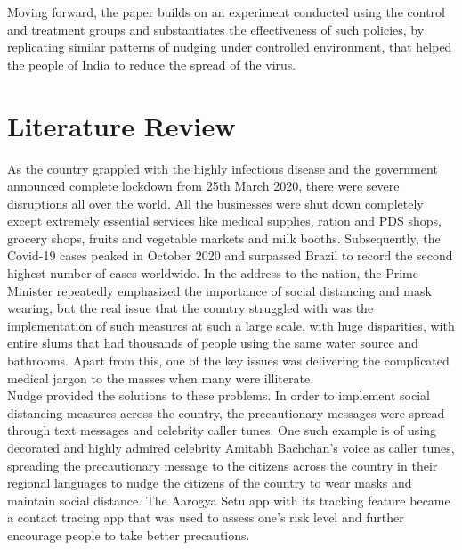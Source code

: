 \documentclass[12pt, a4paper]{article}
\begin{document}
Moving forward, the paper builds on an experiment conducted using the control and treatment groups and substantiates the effectiveness of such policies, by replicating similar patterns of nudging under controlled environment, that helped the people of India to reduce the spread of the virus. \\


\section{\centering Literature Review}
As the country grappled with the highly infectious disease and the government announced complete lockdown from 25th March 2020, there were severe disruptions all over the world. All the businesses were shut down completely except extremely essential services like medical supplies, ration and PDS shops, grocery shops, fruits and vegetable markets and milk booths. Subsequently, the Covid-19 cases peaked in October 2020 and surpassed Brazil to record the second highest number of cases worldwide. In the address to the nation, the Prime Minister repeatedly emphasized the importance of social distancing and mask wearing, but the real issue that the country struggled with was the implementation of such measures at such a large scale, with huge disparities, with entire slums that had thousands of people using the same water source and bathrooms. Apart from this, one of the key issues was delivering the complicated medical jargon to the masses when many were illiterate.\\
Nudge provided the solutions to these problems. In order to implement social distancing measures across the country, the precautionary messages were spread through text messages and celebrity caller tunes. One such example is of using decorated and highly admired celebrity Amitabh Bachchan’s voice as caller tunes, spreading the precautionary message to the citizens across the country in their regional languages to nudge the citizens of the country to wear masks and maintain social distance. The Aarogya Setu app with its tracking feature became a contact tracing app that was used to assess one’s risk level and further encourage people to take better precautions. \citep{article1}
\end{document}
